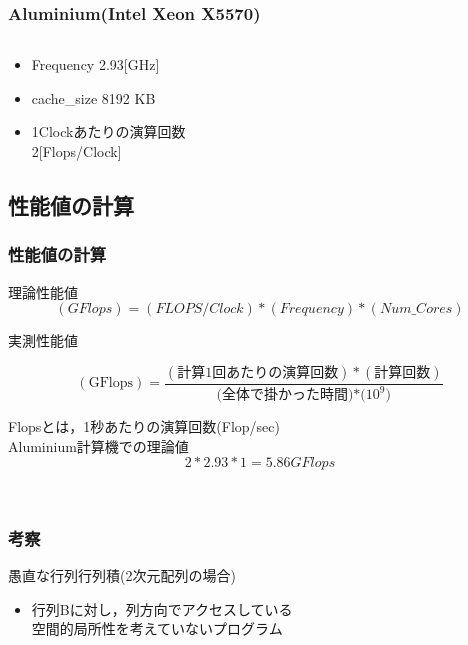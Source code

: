 \documentclass[dvipdfmx]{beamer}
\begin{document}
\begin{frame}
	\frametitle{Aluminium(Intel Xeon X5570)}
	\begin{columns}
	\begin{column}{0.48\textwidth}
	\begin{itemize}
		\item Frequency 2.93[GHz]
		\item cache\_size 8192 KB
		\item 1Clockあたりの演算回数\\ 2[Flops/Clock]
	\end{itemize}


\section{性能値の計算}
\begin{frame}
  \frametitle{性能値の計算}
	\begin{block}{理論性能値}
	\begin{equation*}
		(GFlops) = (FLOPS/Clock) * (Frequency) * (Num\_Cores)
  \end{equation*}
	\end{block}

	\begin{block}{実測性能値}
	\begin{center}
  \begin{equation*}
		(\mbox{GFlops}) = \frac{(\mbox{計算1回あたりの演算回数})*(\mbox{計算回数})}{(\mbox{全体で掛かった時間)*($10^9$)}}
  \end{equation*}
	\end{center}
	\end{block}
	Flopsとは，1秒あたりの演算回数(Flop/sec)\\
	Aluminium計算機での理論値
	\begin{equation*}
		2 * 2.93 * 1 = 5.86GFlops
  \end{equation*}
\end{frame}




\
\begin{frame}
	\frametitle{考察}
	愚直な行列行列積(2次元配列の場合)
	\begin{itemize}
		\item 行列Bに対し，列方向でアクセスしている\\ 空間的局所性を考えていないプログラム
	\end{itemize}
\end{frame}


\end{column}
\end{columns}
\end{frame}
\end{document}
